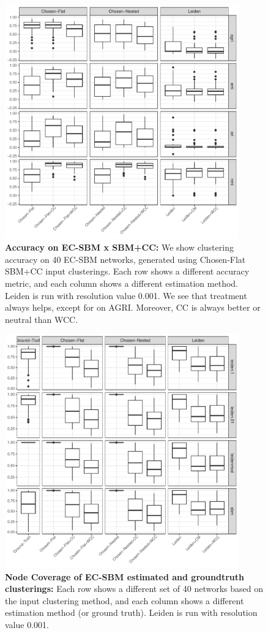 \documentclass[aps,pre,superscriptaddress]{article}
\begin{document}
\begin{figure}[!htpb]
    \centering
    \includegraphics[width=0.9\textwidth]{figures/estimated_accuracy_sbm.pdf}
    \caption[]{\textbf{Accuracy on EC-SBM x SBM+CC:} We show clustering accuracy on 40 EC-SBM networks, generated using Chosen-Flat SBM+CC input clusterings. Each row shows a different accuracy metric, and each column shows a different estimation method. Leiden is run with resolution value 0.001. We see that treatment always helps, except for on AGRI. Moreover, CC is always better or neutral than WCC. }
\end{figure}

\begin{figure}[!htpb]
    \centering
    \includegraphics[width=0.9\textwidth]{figures/node_coverage_ecsbm.pdf}
    \caption[]{\textbf{Node Coverage of EC-SBM estimated and groundtruth clusterings:} Each row shows a different set of 40 networks based on the input clustering method, and each column shows a different estimation method (or ground truth). Leiden is run with resolution value 0.001. }
\end{figure}
\end{document}
